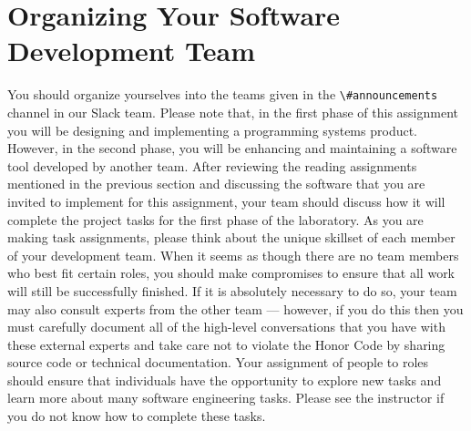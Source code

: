 \documentclass[11pt]{article}
\newcommand{\url}[1]{\lstinline{#1}}
\newcommand{\channel}[1]{\lstinline{#1}}
\begin{document}



\section*{Organizing Your Software Development Team}

You should organize yourselves into the teams given in the \channel{\#announcements} channel in our Slack team. Please
note that, in the first phase of this assignment you will be designing and implementing a programming systems product.
However, in the second phase, you will be enhancing and maintaining a software tool developed by another team. After
reviewing the reading assignments mentioned in the previous section and discussing the software that you are invited to
implement for this assignment, your team should discuss how it will complete the project tasks for the first phase of
the laboratory. As you are making task assignments, please think about the unique skillset of each member of your
development team. When it seems as though there are no team members who best fit certain roles, you should make
compromises to ensure that all work will still be successfully finished. If it is absolutely necessary to do so, your
team may also consult experts from the other team --- however, if you do this then you must carefully document all of
the high-level conversations that you have with these external experts and take care not to violate the Honor Code by
sharing source code or technical documentation. Your assignment of people to roles should ensure that individuals have
the opportunity to explore new tasks and learn more about many software engineering tasks. Please see the instructor if
you do not know how to complete these tasks.
\end{document}
